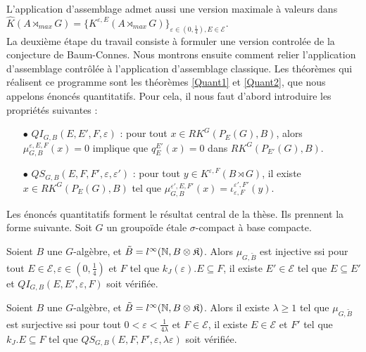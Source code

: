 L'application d'assemblage admet aussi une version maximale à valeurs dans $\hat K(A\rtimes_{max} G) = \{K^{\varepsilon,E}(A\rtimes_{max} G)\}_{\varepsilon \in (0,\frac{1}{4}),E\in\mathcal E}$.\\

La deuxième étape du travail consiste à formuler une version controlée de la conjecture de Baum-Connes. Nous montrons ensuite comment relier l'application d'assemblage contrôlée à l'application d'assemblage classique. Les théorèmes qui réalisent ce programme sont les théorèmes \ref{Quant1} et \ref{Quant2}, que nous appelons énoncés quantitatifs. Pour cela, il nous faut d'abord introduire les propriétés suivantes :\\
\begin{itemize}
\item[$\bullet$] $QI_{G,B}(E,E',F,\varepsilon)$ : pour tout $x\in RK^G(P_E(G), B )$, alors $\mu^{\varepsilon,E,F}_{G,B}(x) = 0$ implique que $q_E^{E'}(x)=0$ dans $RK^G(P_{E'}(G),B)$.
\item[$\bullet$] $QS_{G,B}(E,F,F',\varepsilon,\varepsilon')$ : pour tout $y\in K^{\varepsilon,F}(B\rtimes G)$, il existe $x\in RK^G(P_E(G),B)$ tel que $\mu^{\varepsilon',E,F'}_{G,B}(x)=\iota_{\varepsilon,F}^{\varepsilon',F'}(y)$.\\
\end{itemize} 

Les énoncés quantitatifs forment le résultat central de la thèse. Ils prennent la forme suivante. Soit $G$ un groupoïde étale $\sigma$-compact à base compacte.

\begin{thmfr}
Soient $B$ une $G$-algèbre, et $\tilde B = l^\infty(\mathbb N,B\otimes\mathfrak K)$. Alors $\mu_{G,\tilde B}$ est injective ssi pour tout $E\in\mathcal E,\varepsilon\in(0,\frac{1}{4})$ et $F$ tel que $k_J(\varepsilon).E\subseteq F$, il existe $E' \in\mathcal E$ tel que $E\subseteq E'$ et $QI_{G,B}(E,E',\varepsilon,F)$ soit vérifiée.
\end{thmfr}

\begin{thmfr}
Soient $B$ une $G$-algèbre, et $\tilde B = l^\infty(\mathbb N,B\otimes\mathfrak K)$. Alors il existe $\lambda \geq 1$ tel que $\mu_{G,\tilde B}$ est surjective ssi pour tout $0<\varepsilon<\frac{1}{4\lambda}$ et $F\in\mathcal E$, il existe $E\in\mathcal E$ et $F'$ tel que $k_J .E \subseteq F$ tel que $QS_{G,B}(E,F,F',\varepsilon,\lambda\varepsilon)$ soit vérifiée.
\end{thmfr}

